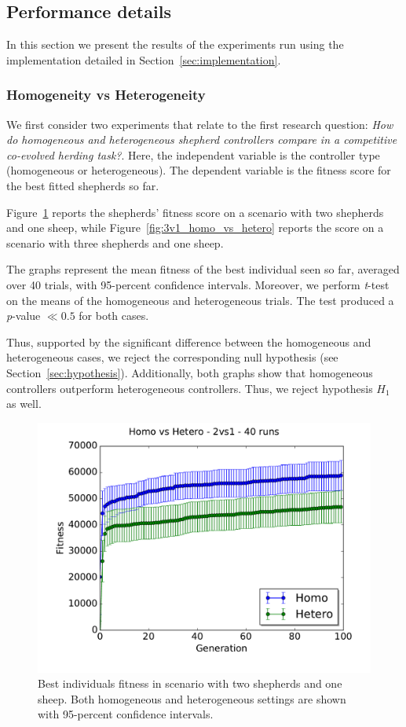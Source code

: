 \documentclass[conference]{IEEEtran}
\begin{document}
\subsection{Performance details}
\label{sec:experiments_performances}
In this section we present the results of the experiments run using the implementation detailed in Section~\ref{sec:implementation}.
\vspace{0.5em}
\subsubsection{Homogeneity vs Heterogeneity}
We first consider two experiments that relate to the first research question: \textit{How do homogeneous and heterogeneous shepherd controllers compare in a competitive co-evolved herding task?}. 
Here, the independent variable is the controller type (homogeneous or heterogeneous). The dependent variable is the fitness score for the best fitted shepherds so far. 

Figure~\ref{fig:2v1_homo_vs_hetero} reports the shepherds' fitness score on a scenario with two shepherds and one sheep, while Figure~\ref{fig:3v1_homo_vs_hetero} reports the score on a scenario with three shepherds and one sheep.

The graphs represent the mean fitness of the best individual seen so far, averaged over 40 trials, with 95-percent confidence intervals.
Moreover, we perform \textit{t}-test on the means of the homogeneous and heterogeneous trials. The test  produced a \textit{p}-value $\ll0.5$ for both cases.

Thus, supported by the significant difference between the homogeneous and heterogeneous cases, we reject the corresponding null hypothesis (see Section~\ref{sec:hypothesis}).
Additionally, both graphs show that homogeneous controllers outperform heterogeneous controllers. Thus, we reject hypothesis $H_1$ as well.

\begin{figure}[ht]
	\centering
	\includegraphics[width=1\hsize]{imgs/homo2v1-hetero2v1-bestSoFar.pdf}
	\caption{Best individuals fitness in scenario with two shepherds and one sheep. Both homogeneous and heterogeneous settings are shown with 95-percent confidence intervals.}
	\label{fig:2v1_homo_vs_hetero}
\end{figure}
\end{document}
